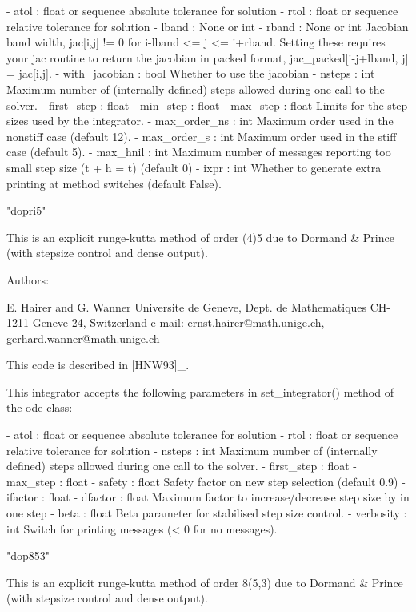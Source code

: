 \begin{DoxyVerb}
    - atol : float or sequence
      absolute tolerance for solution
    - rtol : float or sequence
      relative tolerance for solution
    - lband : None or int
    - rband : None or int
      Jacobian band width, jac[i,j] != 0 for i-lband <= j <= i+rband.
      Setting these requires your jac routine to return the jacobian
      in packed format, jac_packed[i-j+lband, j] = jac[i,j].
    - with_jacobian : bool
      Whether to use the jacobian
    - nsteps : int
      Maximum number of (internally defined) steps allowed during one
      call to the solver.
    - first_step : float
    - min_step : float
    - max_step : float
      Limits for the step sizes used by the integrator.
    - max_order_ns : int
      Maximum order used in the nonstiff case (default 12).
    - max_order_s : int
      Maximum order used in the stiff case (default 5).
    - max_hnil : int
      Maximum number of messages reporting too small step size (t + h = t)
      (default 0)
    - ixpr : int
      Whether to generate extra printing at method switches (default False).

"dopri5"

    This is an explicit runge-kutta method of order (4)5 due to Dormand &
    Prince (with stepsize control and dense output).

    Authors:

        E. Hairer and G. Wanner
        Universite de Geneve, Dept. de Mathematiques
        CH-1211 Geneve 24, Switzerland
        e-mail:  ernst.hairer@math.unige.ch, gerhard.wanner@math.unige.ch

    This code is described in [HNW93]_.

    This integrator accepts the following parameters in set_integrator()
    method of the ode class:

    - atol : float or sequence
      absolute tolerance for solution
    - rtol : float or sequence
      relative tolerance for solution
    - nsteps : int
      Maximum number of (internally defined) steps allowed during one
      call to the solver.
    - first_step : float
    - max_step : float
    - safety : float
      Safety factor on new step selection (default 0.9)
    - ifactor : float
    - dfactor : float
      Maximum factor to increase/decrease step size by in one step
    - beta : float
      Beta parameter for stabilised step size control.
    - verbosity : int
      Switch for printing messages (< 0 for no messages).

"dop853"

    This is an explicit runge-kutta method of order 8(5,3) due to Dormand
    & Prince (with stepsize control and dense output).


\end{DoxyVerb}
